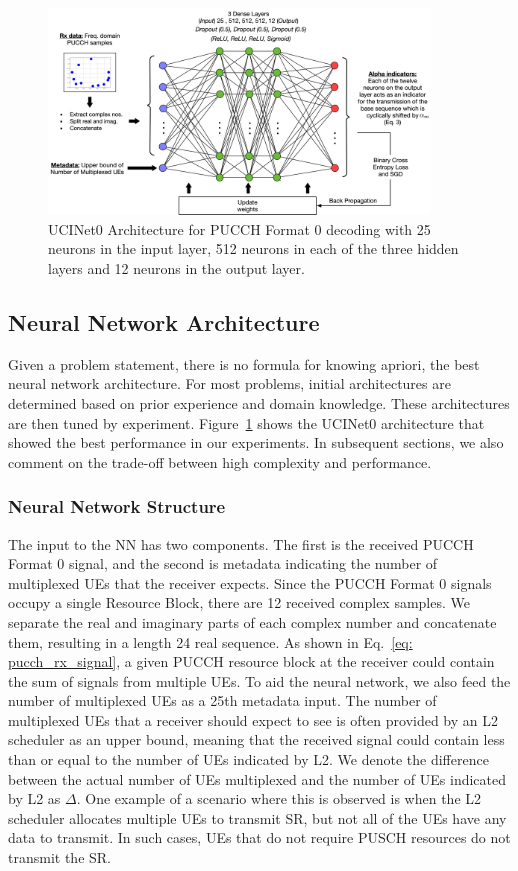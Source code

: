 \documentclass[journal]{IEEEtran}
\begin{document}
\begin{figure}[t!]
\centering
\includegraphics[width=0.9\textwidth]{Figures/3L_pucch_single_nn_framework.png}
\caption{UCINet0 Architecture for PUCCH Format 0 decoding with 25 neurons in the input layer, 512 neurons in each of the three hidden layers and 12 neurons in the output layer.}

\label{fig: nn_arch}
\end{figure}

\subsection{Neural Network Architecture}
Given a problem statement, there is no formula for knowing apriori, the best neural network architecture. For most problems, initial architectures are determined based on prior experience and domain knowledge. These architectures are then tuned by experiment. Figure~\ref{fig: nn_arch} shows the UCINet0 architecture that showed the best performance in our experiments. In subsequent sections, we also comment on the trade-off between high complexity and performance.

\subsubsection{Neural Network Structure}
The input to the NN has two components. The first is the received PUCCH Format 0 signal, and the second is metadata indicating the number of multiplexed UEs that the receiver expects. Since the PUCCH Format 0 signals occupy a single Resource Block, there are 12 received complex samples. We separate the real and imaginary parts of each complex number and concatenate them, resulting in a length 24 real sequence. As shown in Eq.~\eqref{eq: pucch_rx_signal}, a given PUCCH resource block at the receiver could contain the sum of signals from multiple UEs. To aid the neural network, we also feed the number of multiplexed UEs as a 25th metadata input. The number of multiplexed UEs that a receiver should expect to see is often provided by an L2 scheduler as an upper bound, meaning that the received signal could contain less than or equal to the number of UEs indicated by L2. We denote the difference between the actual number of UEs multiplexed and the number of UEs indicated by L2 as $\Delta$. One example of a scenario where this is observed is when the L2 scheduler allocates multiple UEs to transmit SR, but not all of the UEs have any data to transmit. In such cases, UEs that do not require PUSCH resources do not transmit the SR.
\end{document}
